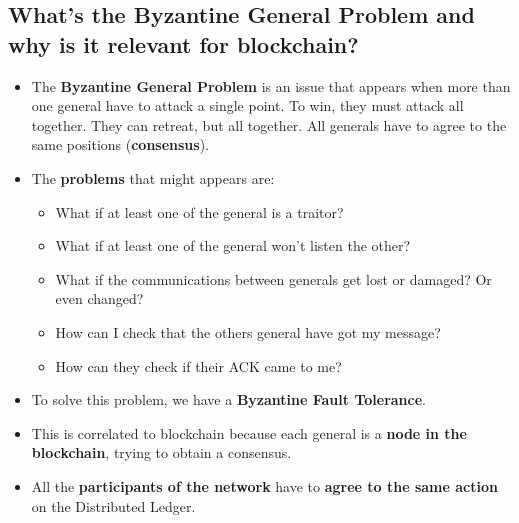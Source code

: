\documentclass[9pt, letterpaper]{article}
\begin{document}
\subsection{What's the Byzantine General Problem and why is it relevant for blockchain?}
\begin{itemize}
	\item The \textbf{Byzantine General Problem} is an issue that appears when more than one general have to attack a single point.
	To win, they must attack all together. They can retreat, but all together. All generals have to agree to the same positions (\textbf{consensus}).
	\item The \textbf{problems} that might appears are:
	\begin{itemize}
		\item What if at least one of the general is a traitor?
		\item What if at least one of the general won't listen the other?
		\item What if the communications between generals get lost or damaged? Or even changed?
		\item How can I check that the others general have got my message? 
		\item How can they check if their ACK came to me?
	\end{itemize}
	\item To solve this problem, we have a \textbf{Byzantine Fault Tolerance}.
	\item This is correlated to blockchain because each general is a \textbf{node in the blockchain}, trying to obtain a consensus. 
	\item All the \textbf{participants of the network} have to \textbf{agree to the same action} on the Distributed Ledger.
\end{itemize}
\end{document}
